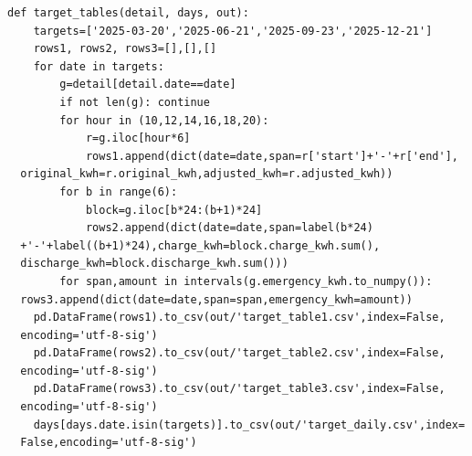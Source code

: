 \begin{verbatim}
def target_tables(detail, days, out):
    targets=['2025-03-20','2025-06-21','2025-09-23','2025-12-21']
    rows1, rows2, rows3=[],[],[]
    for date in targets:
        g=detail[detail.date==date]
        if not len(g): continue
        for hour in (10,12,14,16,18,20):
            r=g.iloc[hour*6]
            rows1.append(dict(date=date,span=r['start']+'-'+r['end'],
  original_kwh=r.original_kwh,adjusted_kwh=r.adjusted_kwh))
        for b in range(6):
            block=g.iloc[b*24:(b+1)*24]
            rows2.append(dict(date=date,span=label(b*24)
  +'-'+label((b+1)*24),charge_kwh=block.charge_kwh.sum(),
  discharge_kwh=block.discharge_kwh.sum()))
        for span,amount in intervals(g.emergency_kwh.to_numpy()):
  rows3.append(dict(date=date,span=span,emergency_kwh=amount))
    pd.DataFrame(rows1).to_csv(out/'target_table1.csv',index=False,
  encoding='utf-8-sig')
    pd.DataFrame(rows2).to_csv(out/'target_table2.csv',index=False,
  encoding='utf-8-sig')
    pd.DataFrame(rows3).to_csv(out/'target_table3.csv',index=False,
  encoding='utf-8-sig')
    days[days.date.isin(targets)].to_csv(out/'target_daily.csv',index=
  False,encoding='utf-8-sig')



\end{verbatim}
